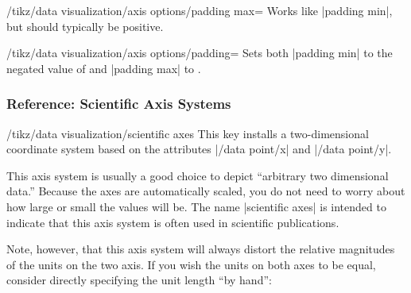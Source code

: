 \begin{key}{/tikz/data visualization/axis options/padding max=}
  Works like |padding min|, but  should typically be positive.
\end{key}

\begin{key}{/tikz/data visualization/axis options/padding=}
  Sets both |padding min| to the negated value of  and
  |padding max| to .
\end{key}


\subsubsection{Reference: Scientific Axis Systems}

\begin{key}{/tikz/data visualization/scientific axes}
  This key installs a two-dimensional coordinate system based on the
  attributes |/data point/x| and |/data point/y|.

\begin{codeexample}[]
\end{codeexample}

  This axis system is usually a good choice to depict ``arbitrary two
  dimensional data.'' Because the axes are automatically scaled, you
  do not need to worry about how large or small the values will
  be. The name |scientific axes| is intended to indicate that this
  axis system is often used in scientific publications.

  Note, however, that this axis system will always distort the
  relative magnitudes of the units on the two axis. If you wish the
  units on both axes to be equal, consider directly specifying the
  unit length ``by hand'':

\begin{codeexample}[]
\end{codeexample}


\end{key}
